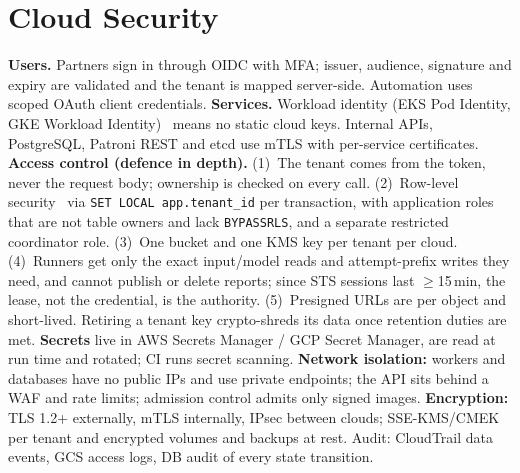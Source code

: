 \documentclass[10pt,a4paper]{article}
\begin{document}
\section{Cloud Security}
\textbf{Users.} Partners sign in through OIDC with MFA; issuer, audience, signature and expiry are validated
and the tenant is mapped server-side. Automation uses scoped OAuth client credentials.
\textbf{Services.} Workload identity (EKS Pod Identity, GKE Workload Identity)~\cite{eks-pod-identity,gke-wi}
means no static cloud keys. Internal APIs, PostgreSQL, Patroni REST and etcd use mTLS with
per-service certificates.
\textbf{Access control (defence in depth).} (1)~The tenant comes from the token, never the request body;
ownership is checked on every call. (2)~Row-level security~\cite{pg-rls} via \texttt{SET LOCAL app.tenant\_id}
per transaction, with application roles that are not table owners and lack \texttt{BYPASSRLS}, and a separate
restricted coordinator role. (3)~One bucket and one KMS key per tenant per cloud. (4)~Runners get only the
exact input/model reads and attempt-prefix writes they need, and cannot publish or delete reports; since STS
sessions last $\geq$15\,min, the lease, not the credential, is the authority. (5)~Presigned URLs are per
object and short-lived. Retiring a tenant key crypto-shreds its data once retention duties are met.
\textbf{Secrets} live in AWS Secrets Manager / GCP Secret Manager, are read at run time and rotated; CI runs
secret scanning. \textbf{Network isolation:} workers and databases have no public IPs and use private
endpoints; the API sits behind a WAF and rate limits; admission control admits only signed images.
\textbf{Encryption:} TLS 1.2+ externally, mTLS internally, IPsec between clouds; SSE-KMS/CMEK per tenant
and encrypted volumes and backups at rest. Audit: CloudTrail data events, GCS access logs, DB audit of
every state transition.

\end{document}
